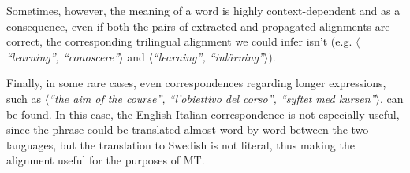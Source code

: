     Sometimes, however, the meaning of a word is highly context-dependent and as a consequence, even if both the pairs of extracted and propagated alignments are correct, the corresponding trilingual alignment we could infer isn't (e.g. $\langle$\textit{``learning'', ``conoscere''}$\rangle$ and $\langle$\textit{``learning'', ``inlärning''}$\rangle$). \smallskip

    Finally, in some rare cases, even correspondences regarding longer expressions, such as $\langle$\textit{``the aim of the course'', ``l'obiettivo del corso'', ``syftet med kursen''}$\rangle$, can be found. In this case, the English-Italian correspondence is not especially useful, since the phrase could be translated almost word by word between the two languages, but the translation to Swedish is not literal, thus making the alignment useful for the purposes of MT.